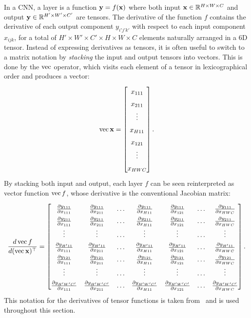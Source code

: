 In a CNN, a layer is a function $\mathbf{y} = f(\mathbf{x})$ where both input $\mathbf{x} \in \mathbb{R}^{H\times W \times C}$ and output $\mathbf{y} \in \mathbb{R}^{H'\times W' \times C'}$ are tensors. The derivative of the function $f$ contains the derivative of each output component $y_{i'j'k'}$ with respect to each input component $x_{ijk}$, for a total of $H'\times W'\times C'\times H\times W\times C$ elements naturally arranged in a 6D tensor. Instead of expressing derivatives as tensors, it is often useful  to switch to a matrix notation by \emph{stacking} the input and output tensors into vectors. This is done by the $\operatorname{vec}$ operator, which visits each element of a tensor in lexicographical order and produces a vector:
\[
\vv \bx
=
\begin{bmatrix}
x_{111} \\
x_{211} \\
\vdots
\\
x_{H11} \\
x_{121} \\
\vdots \\
x_{HWC}  	
\end{bmatrix}.
\]
By stacking both input and output, each layer $f$ can be seen reinterpreted as vector function $\operatorname{vec} f$, whose derivative is the conventional Jacobian matrix:
\[
\renewcommand*{\arraystretch}{1.5}
\frac{d \vv f}{d(\vv \bx)^\top}
=
\begin{bmatrix}
\frac{\partial y_{111}}{\partial x_{111}} & 
\frac{\partial y_{111}}{\partial x_{211}} &
\dots &
\frac{\partial y_{111}}{\partial x_{H11}} &
\frac{\partial y_{111}}{\partial x_{121}} &
\dots &
\frac{\partial y_{111}}{\partial x_{HWC}} \\
\frac{\partial y_{211}}{\partial x_{111}} & 
\frac{\partial y_{211}}{\partial x_{211}} &
\dots &
\frac{\partial y_{211}}{\partial x_{H11}} &
\frac{\partial y_{211}}{\partial x_{121}} &
\dots &
\frac{\partial y_{211}}{\partial x_{HWC}} \\
\vdots & \vdots & \dots & \vdots & \vdots & \dots & \vdots \\
\frac{\partial y_{H'11}}{\partial x_{111}} & 
\frac{\partial y_{H'11}}{\partial x_{211}} &
\dots &
\frac{\partial y_{H'11}}{\partial x_{H11}} &
\frac{\partial y_{H'11}}{\partial x_{121}} &
\dots &
\frac{\partial y_{H'11}}{\partial x_{HWC}} \\
\frac{\partial y_{121}}{\partial x_{111}} & 
\frac{\partial y_{121}}{\partial x_{211}} &
\dots &
\frac{\partial y_{121}}{\partial x_{H11}} &
\frac{\partial y_{121}}{\partial x_{121}} &
\dots &
\frac{\partial y_{121}}{\partial x_{HWC}} \\
\vdots & \vdots & \dots & \vdots & \vdots & \dots & \vdots \\
\frac{\partial y_{H'W'C'}}{\partial x_{111}} & 
\frac{\partial y_{H'W'C'}}{\partial x_{211}} &
\dots &
\frac{\partial y_{H'W'C'}}{\partial x_{H11}} &
\frac{\partial y_{H'W'C'}}{\partial x_{121}} &
\dots &
\frac{\partial y_{H'W'C'}}{\partial x_{HWC}}
\end{bmatrix}.
\]
This notation for the derivatives of tensor functions is taken from~\cite{kinghorn96integrals} and is used throughout this section.

